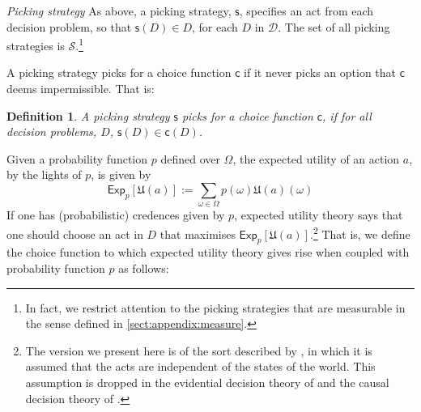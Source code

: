 \documentclass[a4paper,final]{article}
\newtheorem{definition}[theorem]{Definition}
\newcommand\Exp{\mathsf{Exp}}
\newcommand\U{\mathfrak{U}} %
\newcommand{\D}{\mathcal{D}}
\renewcommand\S{\mathcal{S}}
\newcommand\s{\mathsf{s}}
\renewcommand\c{\mathsf{c}} %
\newenvironment{CCM rewritten}
{\begingroup\color{blue}} %
{\endgroup}              %
\begin{document}









\emph{Picking strategy } As above, a picking strategy, $\s$, specifies an act from each decision problem, so that $\s(D)\in D$, for each $D$ in $\D$. The set of all picking strategies is $\S$.\footnote{In fact, we restrict attention to the picking strategies that are measurable in the sense defined in \cref{sect:appendix:measure}.}

A picking strategy picks for a choice function $\c$ if it never picks an option that $\c$ deems impermissible. That is: 
\begin{definition}\label{def:picks for}
	A picking strategy $\s$ \emph{picks for a choice function} $\c$, if for all decision problems, $D$, $\s(D) \in \c(D)$.
\end{definition}


Given a probability function $p$ defined over $\Omega$, the expected utility of an action $a$, by the lights of $p$, is given by \begin{equation}
	\Exp_p [\U(a)]:=\sum_{\omega\in\Omega}p(\omega)\U(a)(\omega)
\end{equation}
If one has (probabilistic) credences given by $p$, expected utility theory says that one should choose an act in $D$ that maximises $\Exp_p[\U(a)]$.\footnote{The version we present here is of the sort described by \citet{savage1954fs}, in which it is assumed that the acts are independent of the states of the world. This assumption is dropped in the evidential decision theory of \citet{jeffrey1965lod} and the causal decision theory of \citet{stalnaker1972ldl, gibbard1978ctk, joyce1999fcdt}.} That is, we define the choice function to which expected utility theory gives rise when coupled with probability function $p$ as follows:
\end{document}
